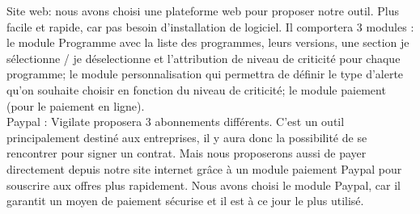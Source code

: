 Site web: nous avons choisi une plateforme web pour proposer notre outil. Plus facile et rapide, car pas besoin d'installation de logiciel. Il comportera 3 modules : le module \og{}Programme\fg{} avec la liste des programmes, leurs versions, une section \og{}je sélectionne / je déselectionne\fg{} et l'attribution de niveau de criticité pour chaque programme; le module \og{}personnalisation\fg{} qui permettra de définir le type d'alerte qu'on souhaite choisir en fonction du niveau de criticité; le module paiement (pour le paiement en ligne).\\

Paypal : Vigilate proposera 3 abonnements différents. C'est un outil principalement destiné aux entreprises, il y aura donc la possibilité de se rencontrer pour signer un contrat. Mais nous proposerons aussi de payer directement depuis notre site internet grâce à un module paiement Paypal pour souscrire aux offres plus rapidement. Nous avons choisi le module Paypal, car il garantit un moyen de paiement sécurise et il est à ce jour le plus utilisé.\\
